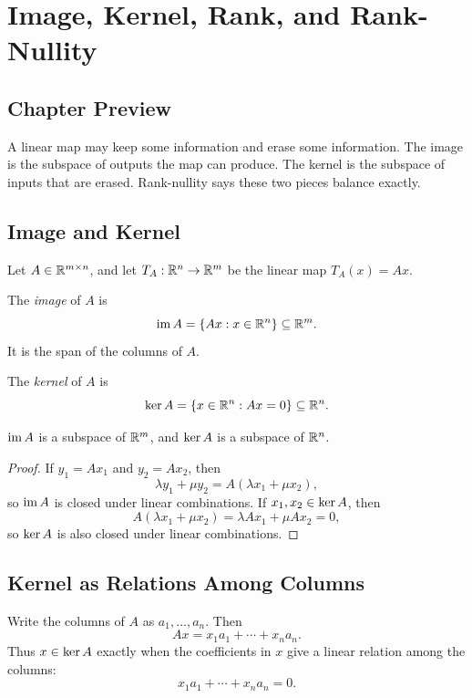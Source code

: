 \chapter{Image, Kernel, Rank, and Rank-Nullity}
\label{ch:image-kernel-rank-nullity}

\section*{Chapter Preview}

A linear map may keep some information and erase some information. The image
is the subspace of outputs the map can produce. The kernel is the subspace of
inputs that are erased. Rank-nullity says these two pieces balance exactly.

\section{Image and Kernel}

Let $A\in\mathbb{R}^{m\times n}$, and let $T_A:\mathbb{R}^n\to\mathbb{R}^m$ be the linear map
$T_A(x)=Ax$.

\begin{definition}
The \emph{image} of $A$ is
\[
  \operatorname{im} A=\{Ax:x\in\mathbb{R}^n\}\subseteq \mathbb{R}^m.
\]
It is the span of the columns of $A$.
\end{definition}

\begin{definition}
The \emph{kernel} of $A$ is
\[
  \operatorname{ker} A=\{x\in\mathbb{R}^n:Ax=0\}\subseteq \mathbb{R}^n.
\]
\end{definition}

\begin{proposition}
$\operatorname{im} A$ is a subspace of $\mathbb{R}^m$, and $\operatorname{ker} A$ is a subspace of $\mathbb{R}^n$.
\end{proposition}

\begin{proof}
If $y_1=Ax_1$ and $y_2=Ax_2$, then
\[
  \lambda y_1+\mu y_2
  =
  A(\lambda x_1+\mu x_2),
\]
so $\operatorname{im} A$ is closed under linear combinations. If $x_1,x_2\in\operatorname{ker} A$, then
\[
  A(\lambda x_1+\mu x_2)=\lambda Ax_1+\mu Ax_2=0,
\]
so $\operatorname{ker} A$ is also closed under linear combinations.
\end{proof}

\section{Kernel as Relations Among Columns}

Write the columns of $A$ as $a_1,\ldots,a_n$. Then
\[
  Ax=x_1a_1+\cdots+x_na_n.
\]
Thus $x\in\operatorname{ker} A$ exactly when the coefficients in $x$ give a linear relation
among the columns:
\[
  x_1a_1+\cdots+x_na_n=0.
\]


